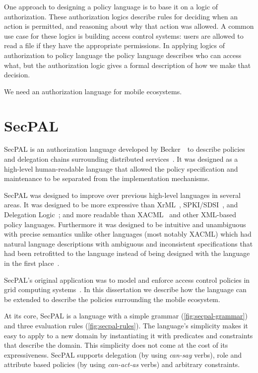 \documentclass[thesis.tex]{subfiles}
\begin{document}
One approach to designing a policy language is to base it on a logic
of authorization.  These authorization logics describe rules for
deciding when an action is permitted, and reasoning about why that
action was allowed.  A common use case for these logics is building
access control systems: users are allowed to read a file if they have
the appropriate permissions.  In applying logics of authorization to
policy language the policy language describes who can access what, but
the authorization logic gives a formal description of how we make that
decision.

We need an authorization language for mobile ecosystems.

\section{SecPAL}

SecPAL is an authorization language developed by Becker~\etal~to
describe policies and delegation chains surrounding distributed
services~\cite{becker_secpal:_2010}. It was designed as a high-level
human-readable language that allowed the policy specification and
maintenance to be separated from the implementation mechanisms.

SecPAL was designed to improve over previous high-level languages in
several areas.  It was designed to be more expressive than
XrML~\cite{kolovski_logic-based_2007},
SPKI/SDSI~\cite{ellison_spki_1999}, and Delegation
Logic~\cite{li_delegation_2003}; and more readable than
XACML~\cite{oasis_extensible_2013} and other XML-based policy
languages.  Furthermore it was designed to be intuitive and
unambiguous with precise semantics unlike other languages (most notably
XACML) which had natural language descriptions with ambiguous and
inconsistent specifications that had been retrofitted to the language
instead of being designed with the language in the first
place~\cite{bryans_reasoning_2005,ramli_logic_2014,masi_formalisation_2012}.

SecPAL's original application was to model and enforce access control
policies in grid computing systems~\cite{becker_secpal:_2010}.  In
this dissertation we describe how the language can be extended to
describe the policies surrounding the mobile ecosystem.

At its core, SecPAL is a language with a simple grammar
(\autoref{fig:secpal-grammar}) and three evaluation rules
(\autoref{fig:secpal-rules}). The language's simplicity makes it easy
to apply to a new domain by instantiating it with predicates and
constraints that describe the domain. This simplicity does not come at
the cost of its expressiveness. SecPAL supports delegation (by using
\emph{can-say} verbs), role and attribute based policies (by using
\emph{can-act-as} verbs) and arbitrary constraints.
\end{document}
